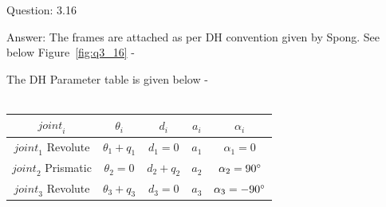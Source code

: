 \documentclass[a4paper]{article}
\begin{document}
\begin{qalist}
		\item[Question: 3.16] \setcounter{equation}{0} %
		\item[Answer:] The frames are attached as per DH convention given by Spong. See below Figure~\ref{fig:q3_16} -\\
			\begin{minipage}{\linewidth}
				\vspace{0.5cm}
				\centering
				\label{fig:q3_16}
				\vspace{0.5cm}
			\end{minipage}
			The DH Parameter table is given below - \\ \\
			\begin{minipage}{\linewidth}
				\centering
				\begin{tabular}{|c|c|c|c|c|}
					\hline
					${joint}_{i}$ & ${\theta}_{i}$ & ${d}_{i}$ & ${a}_{i}$ & ${\alpha}_{i}$\\
					\hline
					${joint}_{1}$ Revolute & ${\theta}_{1} + {q}_{1}$ & ${d}_{1} = 0$ & ${a}_{1}$ & ${\alpha}_{1} = 0$\\
					\hline
					${joint}_{2}$ Prismatic & ${\theta}_{2} = 0$ & ${d}_{2} + {q}_{2}$ & ${a}_{2}$ & ${\alpha}_{2} = 90\degree$\\
					\hline
					${joint}_{3}$ Revolute & ${\theta}_{3} + {q}_{3}$ & ${d}_{3} = 0$ & ${a}_{3}$ & ${\alpha}_{3} = -90 \degree$\\
					\hline
				\end{tabular}
			\end{minipage}		
			

\end{qalist}
\end{document}
